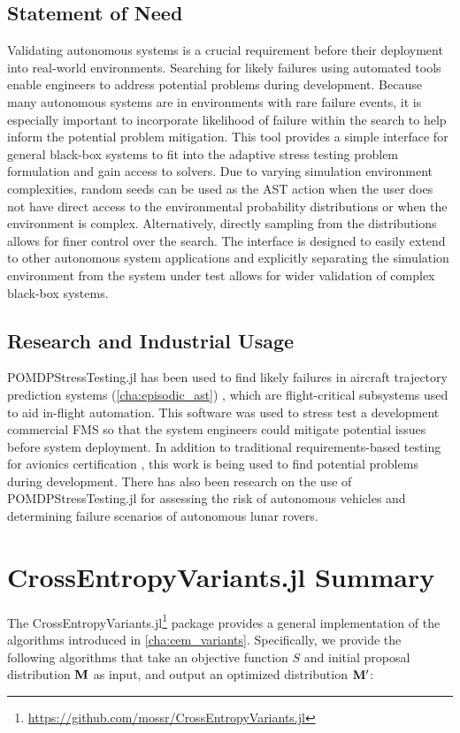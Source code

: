 \subsection{Statement of Need}
Validating autonomous systems is a crucial requirement before their deployment into real-world environments.
Searching for likely failures using automated tools enable engineers to address potential problems during development.
Because many autonomous systems are in environments with rare failure events, it is especially important to incorporate likelihood of failure within the search to help inform the potential problem mitigation.
This tool provides a simple interface for general black-box systems to fit into the adaptive stress testing problem formulation and gain access to solvers.
Due to varying simulation environment complexities, random seeds can be used as the AST action when the user does not have direct access to the environmental probability distributions or when the environment is complex.
Alternatively, directly sampling from the distributions allows for finer control over the search.
The interface is designed to easily extend to other autonomous system applications and explicitly separating the simulation environment from the system under test allows for wider validation of complex black-box systems.



\subsection{Research and Industrial Usage}
POMDPStressTesting.jl has been used to find likely failures in aircraft trajectory prediction systems (\cref{cha:episodic_ast}) \cite{moss2020adaptive}, which are flight-critical subsystems used to aid in-flight automation.
This software was used to stress test a development commercial FMS so that the system engineers could mitigate potential issues before system deployment.
In addition to traditional requirements-based testing for avionics certification \cite{do178c}, this work is being used to find potential problems during development.
There has also been research on the use of POMDPStressTesting.jl for assessing the risk of autonomous vehicles and determining failure scenarios of autonomous lunar rovers.



\section{CrossEntropyVariants.jl Summary}
The CrossEntropyVariants.jl\footnote{\url{https://github.com/mossr/CrossEntropyVariants.jl}} package provides a general implementation of the algorithms introduced in \cref{cha:cem_variants}.
Specifically, we provide the following algorithms that take an objective function $S$ and initial proposal distribution $\mathbf{M}$ as input, and output an optimized distribution $\mathbf{M}'$:

